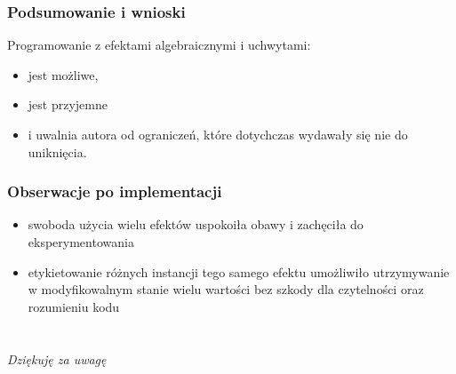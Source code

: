 \documentclass[polish, 13pt]{beamer}
\begin{document}
\begin{frame}
  \frametitle{Podsumowanie i wnioski}
  Programowanie z efektami algebraicznymi i uchwytami:
  \begin{itemize}
  \item jest możliwe,
  \item jest przyjemne
  \item i uwalnia autora od ograniczeń, które dotychczas wydawały się nie do uniknięcia.
  \end{itemize}
\end{frame}

\begin{frame}
  \frametitle{Obserwacje po implementacji}
  \begin{itemize}
  \item swoboda użycia wielu efektów uspokoiła obawy i zachęciła do eksperymentowania
  \item etykietowanie różnych instancji tego samego efektu umożliwiło utrzymywanie w modyfikowalnym stanie wielu wartości bez szkody dla czytelności oraz rozumieniu kodu
  \end{itemize}
\end{frame}

\section{}

\begin{frame}{}
  \vspace{2em}
  \centering
  \Large\emph{Dziękuję za uwagę}
\end{frame}
\end{document}
